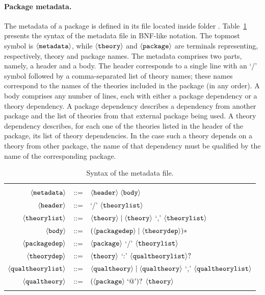 \paragraph{Package metadata.} The metadata of a package is defined
in its  file located inside folder
. Table~\ref{tab.bnf} presents the syntax of the metadata
file in BNF-like notation. The topmost symbol is
$\langle{\texttt{metadata}}\rangle$, while $\langle{\texttt{theory}}\rangle$ and
$\langle{\texttt{package}}\rangle$ are terminals representing, respectively,
theory and package names. The metadata comprises two parts, namely, a
header and a body. The header corresponds to a single line with an `/'
symbol followed by a comma-separated list of theory names; these names
correspond to the names of the theories included in the package (in
any order). A body comprises any number of lines, each with either a
package dependency or a theory dependency. A package dependency
describes a dependency from another package and the list of theories
from that external package being used. A theory dependency describes,
for each one of the theories listed in the header of the package, its
list of theory dependencies. In the case such a theory depends on a
theory from other package, the name of that dependency must be
qualified by the name of the corresponding package.

\begin{table}
  \centering
  \begin{tabular}{r c p{8cm}}
    \hline \\
    $\langle{\texttt{metadata}}\rangle$ & ::= & $\langle{\texttt{header}}\rangle \; \langle{\texttt{body}}\rangle$ \\
    $\langle{\texttt{header}}\rangle$ & ::= & `/' $\langle{\texttt{theorylist}}\rangle$ \\
    $\langle{\texttt{theorylist}}\rangle$ & ::= & $\langle{\texttt{theory}}\rangle \mid \langle{\texttt{theory}}\rangle$ `,' $\langle{\texttt{theorylist}}\rangle$ \\
    $\langle{\texttt{body}}\rangle$ & ::= & $(\langle{\texttt{packagedep}}\rangle \mid \langle{\texttt{theorydep}}\rangle)*$ \\
    $\langle{\texttt{packagedep}}\rangle$ & ::= & $\langle{\texttt{package}}\rangle$ `/' $\langle{\texttt{theorylist}}\rangle$ \\
    $\langle{\texttt{theorydep}}\rangle$ & ::= & $\langle{\texttt{theory}}\rangle$ `:' $\langle{\texttt{qualtheorylist}}\rangle ?$ \\
    $\langle{\texttt{qualtheorylist}}\rangle$ & ::= & $\langle{\texttt{qualtheory}}\rangle \mid \langle{\texttt{qualtheory}}\rangle$ `,' $\langle{\texttt{qualtheorylist}}\rangle$ \\
    $\langle{\texttt{qualtheory}}\rangle$ & ::= & $(\langle{\texttt{package}}\rangle\; \text{`@'})?$ $\langle{\texttt{theory}}\rangle$ \\
    \\
    \hline
  \end{tabular}
  \caption{Syntax of the  metadata file.}
  \label{tab.bnf}
\end{table}

